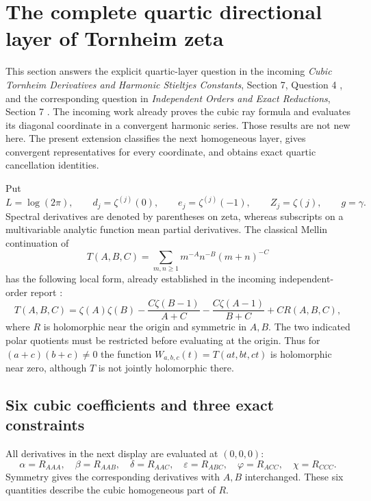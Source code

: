 \section{The complete quartic directional layer of Tornheim zeta}
\label{qt:sec}

This section answers the explicit quartic-layer question in the incoming
\emph{Cubic Tornheim Derivatives and Harmonic Stieltjes Constants},
Section 7, Question 4 \cite{RepoCubic}, and the corresponding question in
\emph{Independent Orders and Exact Reductions}, Section 7 \cite{RepoIndependent}.
The incoming work already proves the cubic ray formula and evaluates its
diagonal coordinate in a convergent harmonic series. Those results are
not new here. The present extension classifies the next homogeneous layer,
gives convergent representatives for every coordinate, and obtains exact
quartic cancellation identities.

Put
\[
 L=\log(2\pi),\qquad d_j=\zeta^{(j)}(0),\qquad
 e_j=\zeta^{(j)}(-1),\qquad Z_j=\zeta(j),\qquad g=\gamma.
\]
Spectral derivatives are denoted by parentheses on zeta, whereas
subscripts on a multivariable analytic function mean partial derivatives.
The classical Mellin continuation \cite{BorweinDilcher} of
\[
 T(A,B,C)=\sum_{m,n\geq1}m^{-A}n^{-B}(m+n)^{-C}
\]
has the following local form, already established in the incoming
independent-order report \cite{RepoIndependent}:
\begin{equation}\label{qt:polar}
 T(A,B,C)=\zeta(A)\zeta(B)
 -\frac{C\zeta(B-1)}{A+C}
 -\frac{C\zeta(A-1)}{B+C}+C R(A,B,C),
\end{equation}
where $R$ is holomorphic near the origin and symmetric in $A,B$.
The two indicated polar quotients must be restricted before evaluating
at the origin. Thus for $(a+c)(b+c)\ne0$ the function
$W_{a,b,c}(t)=T(at,bt,ct)$ is holomorphic near zero, although $T$ is not
jointly holomorphic there.

\subsection{Six cubic coefficients and three exact constraints}

All derivatives in the next display are evaluated at $(0,0,0)$:
\[
 \alpha=R_{AAA},\quad \beta=R_{AAB},\quad
 \delta=R_{AAC},\quad \varepsilon=R_{ABC},\quad
 \varphi=R_{ACC},\quad \chi=R_{CCC}.
\]
Symmetry gives the corresponding derivatives with $A,B$ interchanged.
These six quantities describe the cubic homogeneous part of $R$.

